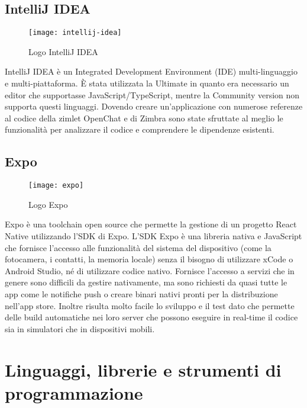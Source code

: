 \subsection{IntelliJ IDEA} \label{subsec:IntelliJ}
	\begin{figure}[H] 
		\centering
		\texttt{[image: intellij-idea]}
		\caption{Logo IntelliJ IDEA}
	\end{figure}
IntelliJ IDEA è un Integrated Development Environment (IDE) multi-linguaggio e 
multi-piattaforma. 
È stata utilizzata la  Ultimate in quanto era necessario un editor che 
supportasse  
JavaScript/TypeScript, mentre la Community version non supporta questi 
linguaggi. 
Dovendo creare un'applicazione con numerose referenze al codice della zimlet 
OpenChat e di Zimbra 
sono state sfruttate al meglio le funzionalità per analizzare il codice e 
comprendere le 
dipendenze esistenti.

\subsection{Expo} \label{subsec:expo}
	\begin{figure}[H] 
		\centering
		\texttt{[image: expo]}
		\caption{Logo Expo}
	\end{figure}
Expo è una toolchain open source che permette la gestione di un progetto React 
Native utilizzando l'SDK di Expo. L'SDK Expo è una libreria nativa e JavaScript 
che fornisce l'accesso alle funzionalità del sistema del dispositivo (come la 
fotocamera, i contatti, la memoria locale) senza il bisogno di utilizzare xCode 
o Android Studio, né di utilizzare codice nativo. Fornisce l'accesso a servizi 
che in genere sono difficili da gestire nativamente, ma sono richiesti da quasi 
tutte le app come le notifiche push o creare binari nativi pronti per la 
distribuzione nell'app store.
Inoltre risulta molto facile lo sviluppo e il test dato che permette delle 
build automatiche nei loro server che possono eseguire in real-time il codice 
sia in simulatori che in dispositivi mobili.


\section{Linguaggi, librerie e strumenti di programmazione}

